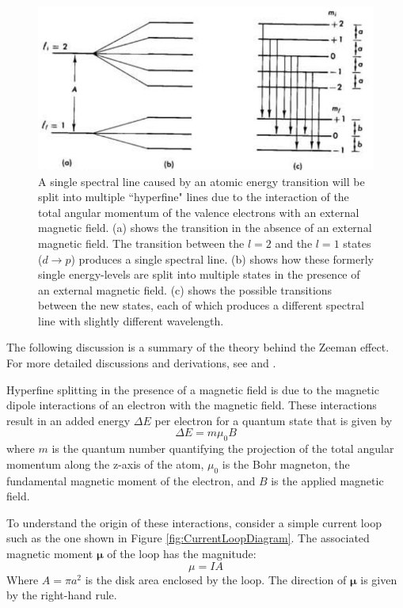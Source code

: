 \documentclass[twocolumn]{article}
\begin{document}
		\begin{figure}
			\centering
			\includegraphics[width=1.0\linewidth]{Images/SpectralSplitting}
			\caption{A single spectral line caused by an atomic energy transition will be split into multiple ``hyperfine" lines due to the interaction of the total angular momentum of the valence electrons with an external magnetic field. (a) shows the transition in the absence of an external magnetic field. The transition between the $l=2$ and the $l=1$ states ($d\rightarrow p$) produces a single spectral line. (b) shows how these formerly single energy-levels are split into multiple states in the presence of an external magnetic field. (c) shows the possible transitions between the new states, each of which produces a different spectral line with slightly different wavelength.\cite{melissinos_experiments_1966}}
			\label{fig:SpectralSplitting}
		\end{figure}
		
		The following discussion is a summary of the theory behind the Zeeman effect. For more detailed discussions and derivations, see \cite{melissinos_experiments_1966} and \cite{stoltenberg_zeeman_2007}.
		
		Hyperfine splitting in the presence of a magnetic field is due to the magnetic dipole interactions of an electron with the magnetic field.
		These interactions result in an added energy $\Delta E$ per electron for a quantum state that is given by
		\begin{equation}
			\Delta E = m\mu_0B
		\end{equation}
		where $m$ is the quantum number quantifying the projection of the total angular momentum along the z-axis of the atom, $\mu_0$ is the Bohr magneton, the fundamental magnetic moment of the electron, and $B$ is the applied magnetic field.
		
		To understand the origin of these interactions, consider a simple current loop such as the one shown in Figure \ref{fig:CurrentLoopDiagram}.
		The associated magnetic moment $\mathbf{\mu}$ of the loop has the magnitude:
		\begin{equation}
			\mu = IA
		\end{equation}
		Where $A=\pi a^2$ is the disk area enclosed by the loop.
		The direction of $\mathbf{\mu}$ is given by the right-hand rule.
		
\end{document}
